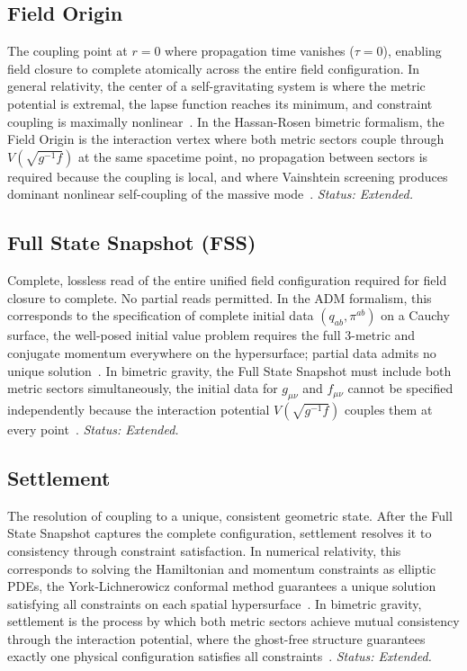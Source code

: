 \documentclass[aps,prd,preprint,superscriptaddress,showpacs,preprintnumbers,amsmath,amssymb,nofootinbib]{revtex4-2}
\begin{document}
\subsection*{Field Origin}

The coupling point at $r = 0$ where propagation time vanishes ($\tau = 0$), enabling field closure to complete atomically across the entire field configuration. In general relativity, the center of a self-gravitating system is where the metric potential is extremal, the lapse function reaches its minimum, and constraint coupling is maximally nonlinear~\cite{mtw1973}. In the Hassan-Rosen bimetric formalism, the Field Origin is the interaction vertex where both metric sectors couple through $V(\sqrt{g^{-1}f})$ at the same spacetime point, no propagation between sectors is required because the coupling is local, and where Vainshtein screening produces dominant nonlinear self-coupling of the massive mode~\cite{hassan2012,vainshtein1972}. \emph{Status: Extended.}

\subsection*{Full State Snapshot (FSS)}

Complete, lossless read of the entire unified field configuration required for field closure to complete. No partial reads permitted. In the ADM formalism, this corresponds to the specification of complete initial data $(q_{ab}, \pi^{ab})$ on a Cauchy surface, the well-posed initial value problem requires the full 3-metric and conjugate momentum everywhere on the hypersurface; partial data admits no unique solution~\cite{choquetbruhat1952,wald1984}. In bimetric gravity, the Full State Snapshot must include both metric sectors simultaneously, the initial data for $g_{\mu\nu}$ and $f_{\mu\nu}$ cannot be specified independently because the interaction potential $V(\sqrt{g^{-1}f})$ couples them at every point~\cite{hassan2012}. \emph{Status: Extended.}

\subsection*{Settlement}

The resolution of coupling to a unique, consistent geometric state. After the Full State Snapshot captures the complete configuration, settlement resolves it to consistency through constraint satisfaction. In numerical relativity, this corresponds to solving the Hamiltonian and momentum constraints as elliptic PDEs, the York-Lichnerowicz conformal method guarantees a unique solution satisfying all constraints on each spatial hypersurface~\cite{york1979,choquetbruhat1952}. In bimetric gravity, settlement is the process by which both metric sectors achieve mutual consistency through the interaction potential, where the ghost-free structure guarantees exactly one physical configuration satisfies all constraints~\cite{hassan2012}. \emph{Status: Extended.}
\end{document}
